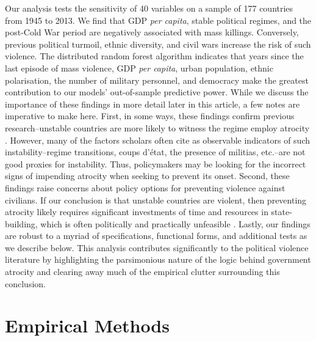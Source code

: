Our analysis tests the sensitivity of 40 variables on a sample of 177 countries from 1945 to 2013. We find that GDP \textit{per capita}, stable political regimes, and the post-Cold War period are negatively associated with mass killings. Conversely, previous political turmoil, ethnic diversity, and civil wars increase the risk of such violence. The distributed random forest algorithm indicates that years since the last episode of mass violence, GDP \textit{per capita}, urban population, ethnic polarisation, the number of military personnel, and democracy make the greatest contribution to our models' out-of-sample predictive power. While we discuss the importance of these findings in more detail later in this article, a few notes are imperative to make here. First, in some ways, these findings confirm previous research–unstable countries are more likely to witness the regime employ atrocity \citep[e.g.,]{goldsmith2013forecasting,harff2003no,krain1997state}.  However, many of the factors scholars often cite as observable indicators of such instability--regime transitions, coups d'état, the presence of militias, etc.--are not good proxies for instability. Thus, policymakers may be looking for the incorrect signs of impending atrocity when seeking to prevent its onset. Second, these findings raise concerns about policy options for preventing violence against civilians. If our conclusion is that unstable countries are violent, then preventing atrocity likely requires significant investments of time and resources in state-building, which is often politically and practically unfeasible \citep{doyle2006making}. Lastly, our findings are robust to a myriad of specifications, functional forms, and additional tests as we describe below. This analysis contributes significantly to the political violence literature by highlighting the parsimonious nature of the logic behind government atrocity and clearing away much of the empirical clutter surrounding this conclusion. 

\section{Empirical Methods}
\label{sec:methods4}

